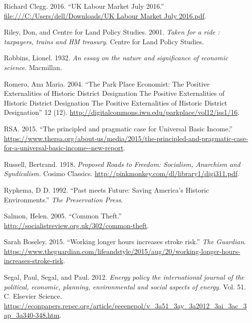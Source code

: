 \documentclass[]{tufte-handout}
\begin{document}
\leavevmode\hypertarget{ref-RichardClegg2016}{}%
Richard Clegg. 2016. ``UK Labour Market July 2016.''
\href{file:///C:/Users/dell/Downloads/UK\%20Labour\%20Market\%20July\%202016.pdf}{file:///C:/Users/dell/Downloads/UK Labour Market July 2016.pdf}.

\leavevmode\hypertarget{ref-Riley2001}{}%
Riley, Don, and Centre for Land Policy Studies. 2001. \emph{Taken for a
ride : taxpayers, trains and HM treasury}. Centre for Land Policy
Studies.

\leavevmode\hypertarget{ref-robbins1932}{}%
Robbins, Lionel. 1932. \emph{An essay on the nature and significance of
economic science}. Macmillan.

\leavevmode\hypertarget{ref-romero2004}{}%
Romero, Ana Maria. 2004. ``The Park Place Economist: The Positive
Externalities of Historic District Designation The Positive
Externalities of Historic District Designation The Positive
Externalities of Historic District Designation'' 12 (12).
\url{http://digitalcommons.iwu.edu/parkplace/vol12/iss1/16}.

\leavevmode\hypertarget{ref-RSA2015}{}%
RSA. 2015. ``The principled and pragmatic case for Universal Basic
Income.''
\url{https://www.thersa.org/about-us/media/2015/the-principled-and-pragmatic-case-for-a-universal-basic-income--new-report}.

\leavevmode\hypertarget{ref-BertrandRussell1918}{}%
Russell, Bertrand. 1918. \emph{Proposed Roads to Freedom: Socialism,
Anarchism and Syndicalism.} Cosimo Classics.
\url{http://pinkmonkey.com/dl/library1/digi311.pdf}.

\leavevmode\hypertarget{ref-Rypkema1992a}{}%
Rypkema, D D. 1992. ``Past meets Future: Saving America's Historic
Environments.'' \emph{The Preservation Press}.

\leavevmode\hypertarget{ref-Salmon2005}{}%
Salmon, Helen. 2005. ``Common Theft.''
\url{http://socialistreview.org.uk/302/common-theft}.

\leavevmode\hypertarget{ref-SarahBoseley2015}{}%
Sarah Boseley. 2015. ``Working longer hours increases stroke risk.''
\emph{The Guardian}.
\url{https://www.theguardian.com/lifeandstyle/2015/aug/20/working-longer-hours-increases-stroke-risk}.

\leavevmode\hypertarget{ref-Segal2012}{}%
Segal, Paul, Segal, and Paul. 2012. \emph{Energy policy the
international journal of the political, economic, planning,
environmental and social aspects of energy.} Vol. 51. C. Elsevier
Science.
\url{https://econpapers.repec.org/article/eeeenepol/v_3a51_3ay_3a2012_3ai_3ac_3ap_3a340-348.htm}.
\end{document}
